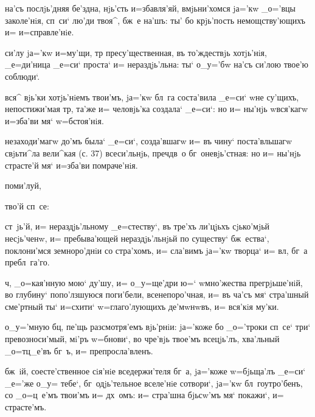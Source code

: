   на'съ послjь'дняя бе'здна, нjь'сть 
и=збавля'яй, вмjьни'хомся jа='кw _о='вцы заколе'нiя, 
сп~си` лю'ди твоя^, бж~е на'шъ: ты' бо крjь'пость 
немощству'ющихъ и= и=справле'нiе.

 си'лу jа='кw и=му'щи, тр 
пресу'щественная, въ то'ждествjь хотjь'нiя, _е=ди'ница 
_е=си` проста` и= нераздjь'льна: ты` о_у='бw на'съ си'лою 
твое'ю соблюди`. 

  вся^ вjь'ки хотjь'нiемъ твои'мъ, jа='кw 
бл~га соста'вила _е=си` w\т не су'щихъ, непостижи'мая 
тр, та'же и= человjь'ка создала` _е=си`: но и= ны'нjь 
w\т вся'кагw и=зба'ви мя` w=бстоя'нiя.

  незаходи'магw до'мъ была` 
_е=си`, созда'вшагw и= въ чину` поста'вльшагw свjьти^ла 
вели^кая (с. 37) всеси'льнjь, преч дв~о 
бг~оневjь'стная: но и= ны'нjь страсте'й мя` и=зба'ви 
помраче'нiя.

 поми'луй, 

     тво'й сп~се:

 ст~jь'й, и= нераздjь'льному _е=стеству`, въ 
тре'хъ ли'цjьхъ сjько'мjьй несjь'ченw, и= пребыва'ющей 
нераздjь'льнjьй по существу` бж~ества`, поклони'мся 
земноро'днiи со стра'хомъ, и= сла'вимъ jа='кw творца` и= 
вл, бг~а пребл~га'го.

     ч, 
_о=кая'нную мою` ду'шу, и= о_у=ще'дри ю=` w\т мно'жества 
прегрjьше'нiй, во глубину` попо'лзшуюся поги'бели, 
всенепоро'чная, и= въ ча'съ мя` стра'шный сме'ртный ты` 
и=схити` w=глаго'лующихъ де'мwнwвъ, и= вся'кiя му'ки.


  о_у='мную бц, пе'щь разсмотря'емъ 
вjь'рнiи: jа='коже бо _о='троки сп~се` три` 
превозноси'мый, мi'ръ w=бнови`, во чре'вjь твое'мъ 
всецjь'лъ, хва'льный _о=тц_е'въ бг~ъ, и= препросла'вленъ.

 бж~iй, соесте'ственное сiя'нiе вседержи'теля 
бг~а, jа='коже w=бjьща'лъ _е=си` _е='же о_у= тебе`, 
бг~одjь'тельное вселе'нiе сотвори`, jа='кw 
бл~гоутро'бенъ, со _о=ц~е'мъ твои'мъ и= дх~омъ: и= 
стра'шна бjьсw'мъ мя` покажи`, и= страсте'мъ. 

